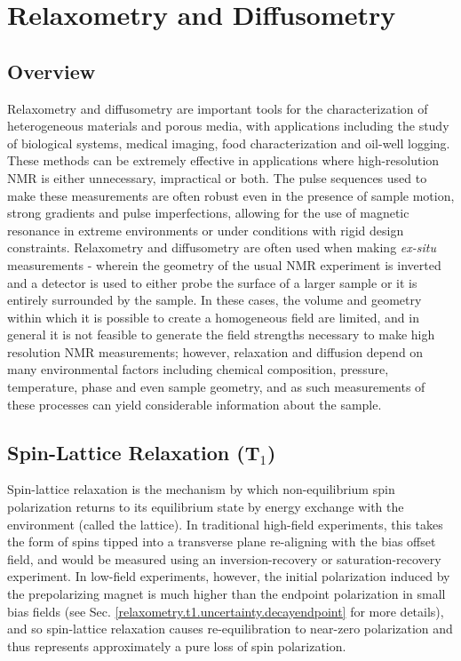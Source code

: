 \documentclass[PaulGanssle-Thesis.tex]{subfiles}
\begin{document}
\chapter{Relaxometry and Diffusometry}
\label{relaxometry}
\section{Overview}
\label{relaxometry.overview}
Relaxometry and diffusometry are important tools for the characterization of heterogeneous materials and porous media\cite{song-nmr-chemical-engineering-2006}, with applications including the study of biological systems,\cite{seland-mri-2005,kopf-biophys-1996} medical imaging, food characterization\cite{hurlimann-jcis-2006,guthausen-jaocs-2004} and oil-well logging.\cite{kleinberg-cmr-2001,hurlimann-emr-2012} These methods can be extremely effective in applications where high-resolution NMR is either unnecessary, impractical or both. The pulse sequences used to make these measurements are often robust even in the presence of sample motion, strong gradients and pulse imperfections,\cite{hurlimann-jmr-2000,hurlimann-jmr-2001} allowing for the use of magnetic resonance in extreme environments or under conditions with rigid design constraints. Relaxometry and diffusometry are often used when making \emph{ex-situ} measurements - wherein the geometry of the usual NMR experiment is inverted and a detector is used to either probe the surface of a larger sample or it is entirely surrounded by the sample.\cite{blumich-mri-mouse-1998,single-sided-nmr,jackson-jmr-1980} In these cases, the volume and geometry within which it is possible to create a homogeneous field are limited, and in general it is not feasible to generate the field strengths necessary to make high resolution NMR measurements; however, relaxation and diffusion depend on many environmental factors including chemical composition, pressure\cite{defries-jcp-1977}, temperature,\cite{Simpson1958,bentum-2011} phase\cite{lerumeur-mri-1987,resing-jcp-1965} and even sample geometry,\cite{vanderweerd-jmr-2002} and as such measurements of these processes can yield considerable information about the sample.

\section{Spin-Lattice Relaxation (T$_1$)}
\label{Section:Relaxometry-T1}
Spin-lattice relaxation is the mechanism by which non-equilibrium spin polarization returns to its equilibrium state by energy exchange with the environment (called the lattice). In traditional high-field experiments, this takes the form of spins tipped into a transverse plane re-aligning with the bias offset field, and would be measured using an inversion-recovery or saturation-recovery experiment. In low-field experiments, however, the initial polarization induced by the prepolarizing magnet is much higher than the endpoint polarization in small bias fields (see Sec. \ref{relaxometry.t1.uncertainty.decayendpoint} for more details), and so spin-lattice relaxation causes re-equilibration to near-zero polarization and thus represents approximately a pure loss of spin polarization.\cite{Levitt2008}
\end{document}
